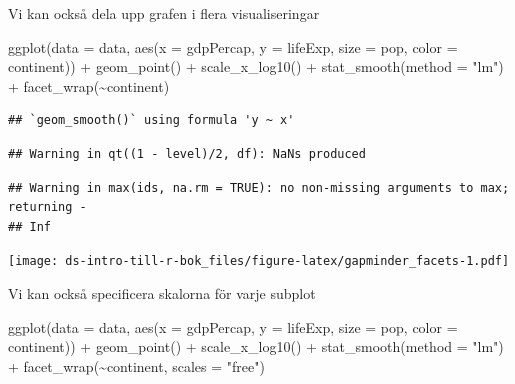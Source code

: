 \documentclass[
]{book}
\newenvironment{Shaded}{\begin{snugshade}}{\end{snugshade}}
\newcommand{\AttributeTok}[1]{\textcolor[rgb]{0.77,0.63,0.00}{#1}}
\newcommand{\FunctionTok}[1]{\textcolor[rgb]{0.00,0.00,0.00}{#1}}
\newcommand{\NormalTok}[1]{#1}
\newcommand{\SpecialCharTok}[1]{\textcolor[rgb]{0.00,0.00,0.00}{#1}}
\newcommand{\StringTok}[1]{\textcolor[rgb]{0.31,0.60,0.02}{#1}}
\begin{document}
Vi kan också dela upp grafen i flera visualiseringar

\begin{Shaded}
\begin{Highlighting}[]
\FunctionTok{ggplot}\NormalTok{(}\AttributeTok{data =}\NormalTok{ data, }\FunctionTok{aes}\NormalTok{(}\AttributeTok{x =}\NormalTok{ gdpPercap,}
                                  \AttributeTok{y =}\NormalTok{ lifeExp,}
                                  \AttributeTok{size =}\NormalTok{ pop,}
                                  \AttributeTok{color =}\NormalTok{ continent)) }\SpecialCharTok{+}
  \FunctionTok{geom\_point}\NormalTok{() }\SpecialCharTok{+}
  \FunctionTok{scale\_x\_log10}\NormalTok{() }\SpecialCharTok{+}
  \FunctionTok{stat\_smooth}\NormalTok{(}\AttributeTok{method =} \StringTok{"lm"}\NormalTok{) }\SpecialCharTok{+}
  \FunctionTok{facet\_wrap}\NormalTok{(}\SpecialCharTok{\textasciitilde{}}\NormalTok{continent)}
\end{Highlighting}
\end{Shaded}

\begin{verbatim}
## `geom_smooth()` using formula 'y ~ x'
\end{verbatim}

\begin{verbatim}
## Warning in qt((1 - level)/2, df): NaNs produced
\end{verbatim}

\begin{verbatim}
## Warning in max(ids, na.rm = TRUE): no non-missing arguments to max; returning -
## Inf
\end{verbatim}

\texttt{[image: ds-intro-till-r-bok\_files/figure-latex/gapminder\_facets-1.pdf]}

Vi kan också specificera skalorna för varje subplot

\begin{Shaded}
\begin{Highlighting}[]
\FunctionTok{ggplot}\NormalTok{(}\AttributeTok{data =}\NormalTok{ data, }\FunctionTok{aes}\NormalTok{(}\AttributeTok{x =}\NormalTok{ gdpPercap,}
                                  \AttributeTok{y =}\NormalTok{ lifeExp,}
                                  \AttributeTok{size =}\NormalTok{ pop,}
                                  \AttributeTok{color =}\NormalTok{ continent)) }\SpecialCharTok{+}
  \FunctionTok{geom\_point}\NormalTok{() }\SpecialCharTok{+}
  \FunctionTok{scale\_x\_log10}\NormalTok{() }\SpecialCharTok{+}
  \FunctionTok{stat\_smooth}\NormalTok{(}\AttributeTok{method =} \StringTok{"lm"}\NormalTok{) }\SpecialCharTok{+}
  \FunctionTok{facet\_wrap}\NormalTok{(}\SpecialCharTok{\textasciitilde{}}\NormalTok{continent, }\AttributeTok{scales =} \StringTok{"free"}\NormalTok{)}
\end{Highlighting}
\end{Shaded}
\end{document}
